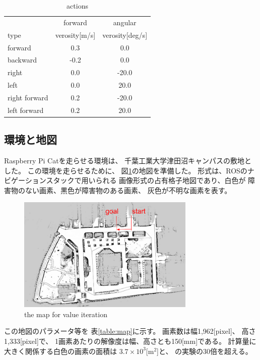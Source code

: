 \documentclass{jarticle}
\begin{document}
\begin{table}[hbtp]
	\caption{actions}
	\label{table:actions}
	\centering
	\begin{small}
	\begin{tabular}{l|cc}
 		\hline
		& forward & angular \\
 		type & verosity[m/s] & verosity[deg/s] \\
 		\hline \hline
 		forward & 0.3 & 0.0 \\
 		backward & -0.2 & 0.0 \\
 		right & 0.0 & -20.0 \\
 		left & 0.0 & 20.0 \\
 		right forward & 0.2 & -20.0 \\
 		left forward & 0.2 & 20.0 \\
	 \hline
	\end{tabular}
	\end{small}
\end{table}


\subsection{環境と地図}

Raspberry Pi Catを走らせる環境は、
千葉工業大学津田沼キャンパスの敷地とした。
この環境を走らせるために、
図\ref{fig:tsudanuma}の地図を準備した。
形式は、ROSのナビゲーションスタックで用いられる
画像形式の占有格子地図であり、白色が
障害物のない画素、黒色が障害物のある画素、
灰色が不明な画素を表す。

\begin{figure}[htb]
  \centering
   \includegraphics[height=55mm]{./figs/tsudanuma.png}
   \caption{the map for value iteration}
	\label{fig:tsudanuma}
\end{figure}

この地図のパラメータ等を
表\ref{table:map}に示す。
画素数は幅1,962[pixel]、
高さ1,333[pixel]で、
1画素あたりの解像度は幅、高さとも150[mm]である。
計算量に大きく関係する白色の画素の面積は
$3.7\times 10^3$[m$^2$]と、\cite{上田rsj2021}
の実験の30倍を超える。
\end{document}
